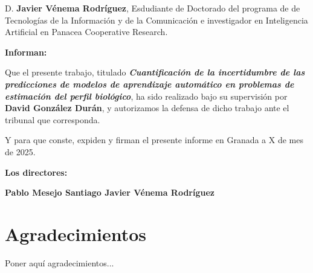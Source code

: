 \vspace{0.5cm}

D. \textbf{Javier Vénema Rodríguez}, Esdudiante de Doctorado del programa de de Tecnologías de la Información y de la Comunicación e investigador en Inteligencia Artificial en Panacea Cooperative Research.

\vspace{0.5cm}

\textbf{Informan:}

\vspace{0.5cm}

Que el presente trabajo, titulado \textit{\textbf{Cuantificación de la incertidumbre de las predicciones de modelos de aprendizaje automático en problemas de estimación del perfil biológico}},
ha sido realizado bajo su supervisión por \textbf{David González Durán}, y autorizamos la defensa de dicho trabajo ante el tribunal
que corresponda.

\vspace{0.5cm}

Y para que conste, expiden y firman el presente informe en Granada a X de mes de 2025.

\vspace{1cm}

\textbf{Los directores:}

\vspace{5cm}

\noindent \textbf{Pablo Mesejo Santiago \hfill Javier Vénema Rodríguez}


\cleardoublepage
\chapter*{Agradecimientos}
\thispagestyle{empty}

\vspace{1cm}

Poner aquí agradecimientos...
